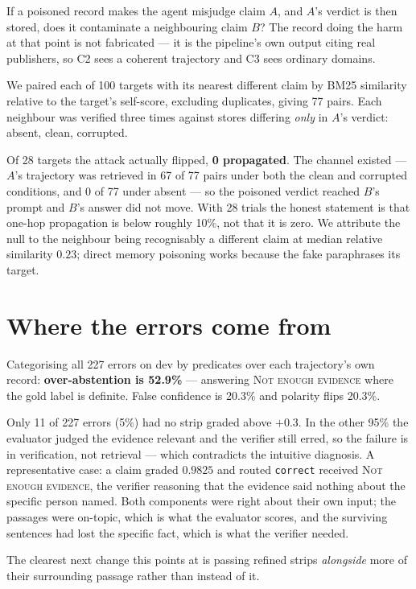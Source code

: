 \documentclass[11pt]{article}
\begin{document}
If a poisoned record makes the agent misjudge claim $A$, and $A$'s verdict is
then stored, does it contaminate a neighbouring claim $B$? The record doing the
harm at that point is not fabricated --- it is the pipeline's own output citing
real publishers, so C2 sees a coherent trajectory and C3 sees ordinary domains.

We paired each of 100 targets with its nearest different claim by BM25
similarity relative to the target's self-score, excluding duplicates, giving 77
pairs. Each neighbour was verified three times against stores differing
\emph{only} in $A$'s verdict: absent, clean, corrupted.

Of 28 targets the attack actually flipped, \textbf{0 propagated}. The channel
existed --- $A$'s trajectory was retrieved in 67 of 77 pairs under both the
clean and corrupted conditions, and 0 of 77 under absent --- so the poisoned
verdict reached $B$'s prompt and $B$'s answer did not move. With 28 trials the
honest statement is that one-hop propagation is below roughly 10\%, not that it
is zero. We attribute the null to the neighbour being recognisably a different
claim at median relative similarity $0.23$; direct memory poisoning works
because the fake paraphrases its target.

\section{Where the errors come from}
\label{sec:failures}

Categorising all 227 errors on dev by predicates over each trajectory's own
record: \textbf{over-abstention is 52.9\%} --- answering \textsc{Not enough
evidence} where the gold label is definite. False confidence is 20.3\% and
polarity flips 20.3\%.

Only 11 of 227 errors (5\%) had no strip graded above $+0.3$. In the other 95\%
the evaluator judged the evidence relevant and the verifier still erred, so the
failure is in verification, not retrieval --- which contradicts the intuitive
diagnosis. A representative case: a claim graded $0.9825$ and routed
\texttt{correct} received \textsc{Not enough evidence}, the verifier reasoning
that the evidence said nothing about the specific person named. Both components
were right about their own input; the passages were on-topic, which is what the
evaluator scores, and the surviving sentences had lost the specific fact, which
is what the verifier needed.

The clearest next change this points at is passing refined strips \emph{alongside}
more of their surrounding passage rather than instead of it.
\end{document}

